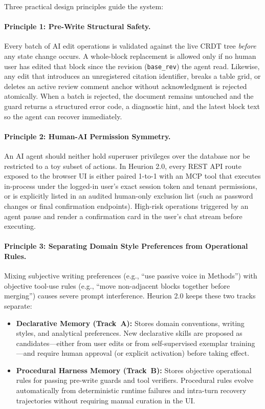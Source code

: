 \documentclass[11pt,a4paper]{article}
\begin{document}
Three practical design principles guide the system:

\paragraph{Principle 1: Pre-Write Structural Safety.}
Every batch of AI edit operations is validated against the live CRDT tree \emph{before} any state change occurs. A whole-block replacement is allowed only if no human user has edited that block since the revision (\texttt{base\_rev}) the agent read. Likewise, any edit that introduces an unregistered citation identifier, breaks a table grid, or deletes an active review comment anchor without acknowledgment is rejected atomically. When a batch is rejected, the document remains untouched and the guard returns a structured error code, a diagnostic hint, and the latest block text so the agent can recover immediately.

\paragraph{Principle 2: Human-AI Permission Symmetry.}
An AI agent should neither hold superuser privileges over the database nor be restricted to a toy subset of actions. In Heurion 2.0, every REST API route exposed to the browser UI is either paired 1-to-1 with an MCP tool that executes in-process under the logged-in user's exact session token and tenant permissions, or is explicitly listed in an audited human-only exclusion list (such as password changes or final confirmation endpoints). High-risk operations triggered by an agent pause and render a confirmation card in the user's chat stream before executing.

\paragraph{Principle 3: Separating Domain Style Preferences from Operational Rules.}
Mixing subjective writing preferences (e.g., ``use passive voice in Methods'') with objective tool-use rules (e.g., ``move non-adjacent blocks together before merging'') causes severe prompt interference. Heurion 2.0 keeps these two tracks separate:
\begin{itemize}[leftmargin=1.5em,itemsep=1pt]
  \item \textbf{Declarative Memory (Track~A):} Stores domain conventions, writing styles, and analytical preferences. New declarative skills are proposed as candidates---either from user edits or from self-supervised exemplar training---and require human approval (or explicit activation) before taking effect.
  \item \textbf{Procedural Harness Memory (Track~B):} Stores objective operational rules for passing pre-write guards and tool verifiers. Procedural rules evolve automatically from deterministic runtime failures and intra-turn recovery trajectories without requiring manual curation in the UI.
\end{itemize}
\end{document}
